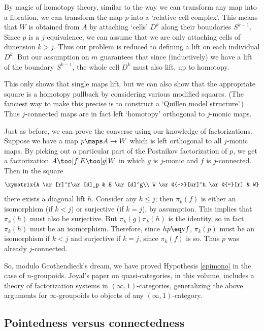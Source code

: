\documentclass[12pt]{amsart}
\begin{document}
By magic of homotopy theory, similar to the way we can transform any
map into a fibration, we can transform the map $p$ into a `relative
cell complex'.  This means that $W$ is obtained from $A$ by attaching
`cells' $D^k$ along their boundaries $S^{k-1}$.  Since $p$ is a
$j$-equivalence, we can assume that we are only attaching cells of
dimension $k>j$.  Thus our problem is reduced to defining a lift on
each individual $D^k$.  But our assumption on $m$ guarantees that
since (inductively) we have a lift of the boundary $S^{k-1}$, the
whole cell $D^k$ must also lift, up to homotopy.

This only shows that single maps lift, but we can also show that the
appropriate square is a homotopy pullback by considering various
modified squares.  (The fanciest way to make this precise is to
construct a `Quillen model structure'.)  Thus $j$-connected maps are
in fact left `homotopy' orthogonal to $j$-monic maps.

Just as before, we can prove the converse using our knowledge of
factorizations.  Suppose we have a map $p\maps A\to W$ which is left
orthogonal to all $j$-monic maps.  By picking out a particular part of
the Postnikov factorization of $p$, we get a factorization $A\too[f]
E\too[g] W$ in which $g$ is $j$-monic and $f$ is $j$-connected.  Then
in the square
\[\xymatrix{A \ar[r]^f\ar[d]_p & E \ar[d]^g\\
  W \ar@{-->}[ur]^h \ar@{=}[r] & W}\]
there exists a diagonal lift $h$.  Consider any $k\le j$; then
$\pi_k(f)$ is either an isomorphism (if $k< j$) or surjective (if
$k=j$), by assumption.  This implies that $\pi_k(h)$ must also be
surjective.  But $\pi_k(g)\pi_k(h)$ is the identity, so in fact
$\pi_k(h)$ must be an isomorphism.  Therefore, since $hp\eqv f$,
$\pi_k(p)$ must be an isomorphism if $k<j$ and surjective if $k=j$,
since $\pi_k(f)$ is so.  Thus $p$ was already $j$-connected.

So, modulo Grothendieck's dream, we have proved
Hypothesis \ref{epimono} in the case of $n$-groupoids.
Joyal's paper on quasi-categories, in this volume, includes a theory
of factorization systems in $(\infty,1)$-categories, generalizing the
above arguments for $\infty$-groupoids to objects of any
$(\infty,1)$-category.

\subsection{Pointedness versus connectedness}
\label{sec:pointed-vs-connected}
\end{document}
